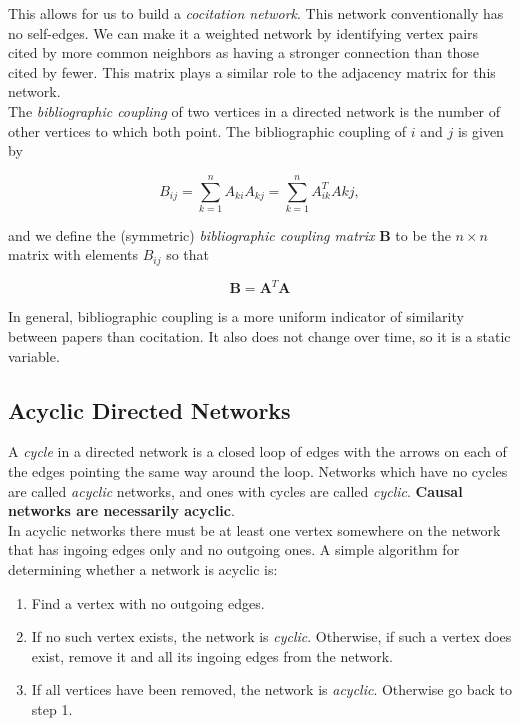 \documentclass[12pt]{book}
\begin{document}
This allows for us to build a \textit{cocitation network}.  This network conventionally has no self-edges.  We can make it a weighted network by identifying vertex pairs cited by more common neighbors as having a stronger connection than those cited by fewer.  This matrix plays a similar role to the adjacency matrix for this network. \\

The \textit{bibliographic coupling} of two vertices in a directed network is the number of other vertices to which both point.  The bibliographic coupling of $i$ and $j$ is given by

\begin{equation}
B_{ij} = \sum\limits_{k=1}^n A_{ki}A_{kj} = \sum\limits_{k=1}^n A_{ik}^TA{kj},
\end{equation}

and we define the (symmetric) \textit{bibliographic coupling matrix} \textbf{B} to be the $n \times n$ matrix with elements $B_{ij}$ so that

\begin{equation}
\mathbf{B} = \mathbf{A}^T\mathbf{A}
\end{equation}

In general, bibliographic coupling is a more uniform indicator of similarity between papers than cocitation.  It also does not change over time, so it is a static variable.

\subsection{Acyclic Directed Networks}
A \textit{cycle} in a directed network is a closed loop of edges with the arrows on each of the edges pointing the same way around the loop.  Networks which have no cycles are called \textit{acyclic} networks, and ones with cycles are called \textit{cyclic}.  \textbf{Causal networks are necessarily acyclic}. \\
In acyclic networks there must be at least one vertex somewhere on the network that has ingoing edges only and no outgoing ones.  A simple algorithm for determining whether a network is acyclic is:
\begin{enumerate}
  \item Find a vertex with no outgoing edges.
  \item If no such vertex exists, the network is \textit{cyclic}.  Otherwise, if such a vertex does exist, remove it and all its ingoing edges from the network.
  \item If all vertices have been removed, the network is \textit{acyclic}.  Otherwise go back to step 1.
\end{enumerate}
\end{document}

